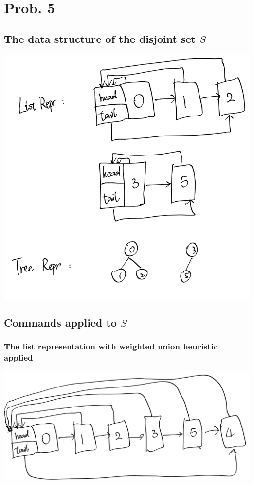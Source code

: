 \documentclass[12pt]{article}
\begin{document}
\section{Prob. 5}

\subsection{The data structure of the disjoint set $S$}

\includegraphics[list representation and tree representation]{pics/as3prob5.1.png}

\subsection{Commands applied to $S$}

\subsubsection{The list representation with weighted union heuristic applied}
\includegraphics[list representation]{pics/as3prob5.2.png}
\end{document}
